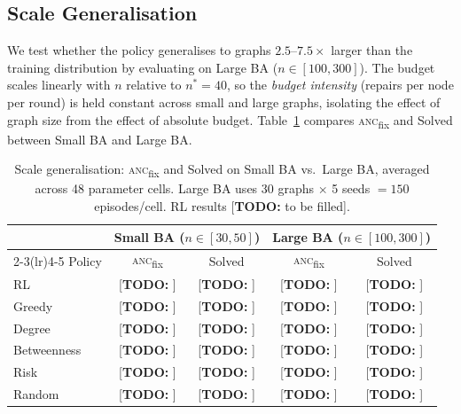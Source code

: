 \documentclass[11pt]{article}
\newcommand{\anc}{\textsc{anc}}
\newcommand{\ancfix}{\anc{}\textsubscript{fix}}
\newcommand{\todo}[1]{\textcolor{red!70!black}{[\textbf{TODO:} #1]}}
\newcommand{\nstar}{n^{*}}
\begin{document}
\subsection{Scale Generalisation}
\label{sec:scale_gen}

We test whether the policy generalises to graphs $2.5$--$7.5\times$
larger than the training distribution by evaluating on Large BA
($n\in[100,300]$).
The budget scales linearly with $n$ relative to $\nstar = 40$, so the
\emph{budget intensity} (repairs per node per round) is held constant
across small and large graphs, isolating the effect of graph size from
the effect of absolute budget.
Table~\ref{tab:scale_gen} compares \ancfix{} and Solved between Small BA
and Large BA.

\begin{table}[htbp]
\centering
\caption{Scale generalisation: \ancfix{} and Solved on Small BA
         vs.\ Large BA, averaged across 48 parameter cells.
         Large BA uses 30 graphs $\times$ 5 seeds $= 150$ episodes/cell.
         RL results \todo{to be filled}.}
\label{tab:scale_gen}
\setlength{\tabcolsep}{6pt}
\begin{tabular}{l cccc}
\toprule
 & \multicolumn{2}{c}{Small BA ($n\!\in\![30,50]$)}
 & \multicolumn{2}{c}{Large BA ($n\!\in\![100,300]$)} \\
\cmidrule(lr){2-3}\cmidrule(lr){4-5}
Policy      & \ancfix{} & Solved  & \ancfix{} & Solved  \\
\midrule
RL          & \todo{}   & \todo{} & \todo{}   & \todo{} \\
Greedy      & \todo{}   & \todo{} & \todo{}   & \todo{} \\
Degree      & \todo{}   & \todo{} & \todo{}   & \todo{} \\
Betweenness & \todo{}   & \todo{} & \todo{}   & \todo{} \\
Risk        & \todo{}   & \todo{} & \todo{}   & \todo{} \\
Random      & \todo{}   & \todo{} & \todo{}   & \todo{} \\
\bottomrule
\end{tabular}
\end{table}

\end{document}

